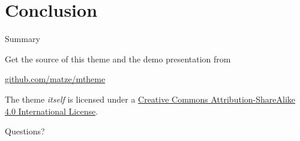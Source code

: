 \section{Conclusion}

\begin{frame}{Summary}

    Get the source of this theme and the demo presentation from

    \begin{center}\url{github.com/matze/mtheme}\end{center}

    The theme \emph{itself} is licensed under a
    \href{http://creativecommons.org/licenses/by-sa/4.0/}{Creative Commons
    Attribution-ShareAlike 4.0 International License}.

    \begin{center}\ccbysa\end{center}

\end{frame}

\begin{frame}[standout]
    Questions?
\end{frame}
